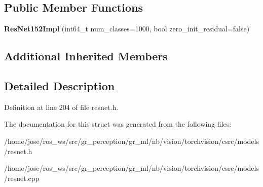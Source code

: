 \subsection*{Public Member Functions}
\begin{DoxyCompactItemize}
\item 
\mbox{\label{structvision_1_1models_1_1ResNet152Impl_a904e30b5428fe7925166f0032201cff9}} 
{\bfseries Res\+Net152\+Impl} (int64\+\_\+t num\+\_\+classes=1000, bool zero\+\_\+init\+\_\+residual=false)
\end{DoxyCompactItemize}
\subsection*{Additional Inherited Members}


\subsection{Detailed Description}


Definition at line 204 of file resnet.\+h.



The documentation for this struct was generated from the following files\+:\begin{DoxyCompactItemize}
\item 
/home/jose/ros\+\_\+ws/src/gr\+\_\+perception/gr\+\_\+ml/nb/vision/torchvision/csrc/models/resnet.\+h\item 
/home/jose/ros\+\_\+ws/src/gr\+\_\+perception/gr\+\_\+ml/nb/vision/torchvision/csrc/models/resnet.\+cpp\end{DoxyCompactItemize}
